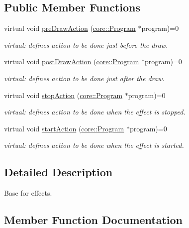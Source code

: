 \subsection*{Public Member Functions}
\begin{DoxyCompactItemize}
\item 
virtual void \hyperlink{classfillwave_1_1effects_1_1Effect_a99c243cb10f504bfc6193e5e81926920}{pre\+Draw\+Action} (\hyperlink{classfillwave_1_1core_1_1Program}{core\+::\+Program} $\ast$program)=0
\begin{DoxyCompactList}\small\item\em virtual\+: defines action to be done just before the draw. \end{DoxyCompactList}\item 
virtual void \hyperlink{classfillwave_1_1effects_1_1Effect_ae01123633990402e11226c4d9a2dce1b}{post\+Draw\+Action} (\hyperlink{classfillwave_1_1core_1_1Program}{core\+::\+Program} $\ast$program)=0
\begin{DoxyCompactList}\small\item\em virtual\+: defines action to be done just after the draw. \end{DoxyCompactList}\item 
virtual void \hyperlink{classfillwave_1_1effects_1_1Effect_aed8c053b5798cbbc6668117989d18ead}{stop\+Action} (\hyperlink{classfillwave_1_1core_1_1Program}{core\+::\+Program} $\ast$program)=0
\begin{DoxyCompactList}\small\item\em virtual\+: defines action to be done when the effect is stopped. \end{DoxyCompactList}\item 
virtual void \hyperlink{classfillwave_1_1effects_1_1Effect_af0a4aa202fa7201cd19cedf71f6c682a}{start\+Action} (\hyperlink{classfillwave_1_1core_1_1Program}{core\+::\+Program} $\ast$program)=0
\begin{DoxyCompactList}\small\item\em virtual\+: defines action to be done when the effect is started. \end{DoxyCompactList}\end{DoxyCompactItemize}


\subsection{Detailed Description}
Base for effects. 

\subsection{Member Function Documentation}
\hypertarget{classfillwave_1_1effects_1_1Effect_ae01123633990402e11226c4d9a2dce1b}{}
